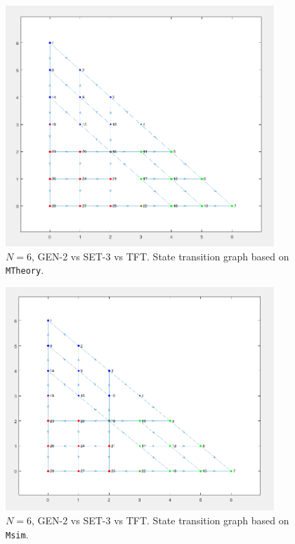 \documentclass[12pt]{report}
\begin{document}
\begin{figure}
    \centering
    \includegraphics[width=0.9\textwidth]{A10-StateTransitionGraphTheory.png}
    \caption{$N=6$, GEN-2 vs SET-3 vs TFT. State transition graph based on \texttt{MTheory}.}
    \label{A10}
\end{figure}

\begin{figure}
    \centering
    \includegraphics[width=0.9\textwidth]{A11-StateTransitionGraphSimulation.png}
    \caption{$N=6$, GEN-2 vs SET-3 vs TFT. State transition graph based on \texttt{Msim}.}
    \label{A11}
\end{figure}
\end{document}
